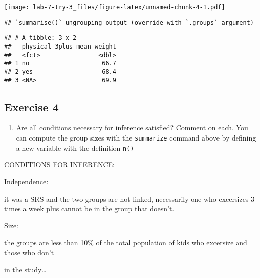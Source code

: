 \documentclass[
]{article}
\newenvironment{Shaded}{\begin{snugshade}}{\end{snugshade}}
\newcommand{\DataTypeTok}[1]{\textcolor[rgb]{0.13,0.29,0.53}{#1}}
\newcommand{\KeywordTok}[1]{\textcolor[rgb]{0.13,0.29,0.53}{\textbf{#1}}}
\newcommand{\NormalTok}[1]{#1}
\newcommand{\OperatorTok}[1]{\textcolor[rgb]{0.81,0.36,0.00}{\textbf{#1}}}
\newcommand{\OtherTok}[1]{\textcolor[rgb]{0.56,0.35,0.01}{#1}}
\newcommand{\StringTok}[1]{\textcolor[rgb]{0.31,0.60,0.02}{#1}}
\providecommand{\tightlist}{%
  \setlength{\itemsep}{0pt}\setlength{\parskip}{0pt}}
\begin{document}
\texttt{[image: lab-7-try-3\_files/figure-latex/unnamed-chunk-4-1.pdf]}

\begin{Shaded}
\end{Shaded}

\begin{verbatim}
## `summarise()` ungrouping output (override with `.groups` argument)
\end{verbatim}

\begin{verbatim}
## # A tibble: 3 x 2
##   physical_3plus mean_weight
##   <fct>                <dbl>
## 1 no                    66.7
## 2 yes                   68.4
## 3 <NA>                  69.9
\end{verbatim}

\hypertarget{exercise-4}{%
\subsection{Exercise 4}\label{exercise-4}}

\begin{enumerate}
\def\labelenumi{\arabic{enumi}.}
\tightlist
\item
  Are all conditions necessary for inference satisfied? Comment on each.
  You can compute the group sizes with the \texttt{summarize} command
  above by defining a new variable with the definition \texttt{n()}
\end{enumerate}

CONDITIONS FOR INFERENCE:

Independence:

it was a SRS and the two groups are not linked, necessarily one who
excersizes 3 times a week plus cannot be in the group that doesn't.

Size:

the groups are less than 10\% of the total population of kids who
excersize and those who don't

in the study\ldots{}
\end{document}
